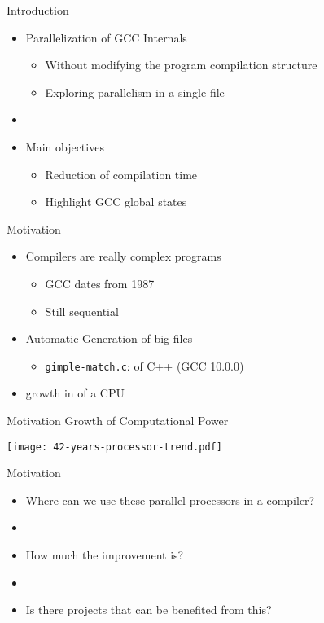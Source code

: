\begin{frame}{Introduction}
    \begin{itemize}
        \item Parallelization of GCC Internals
        \begin{itemize}
            \item Without modifying the program compilation structure
            \item Exploring parallelism in a single file
        \end{itemize}
        \item[]
        \item Main objectives
        \begin{itemize}
            \item Reduction of compilation time
            \item Highlight GCC global states
        \end{itemize}
    \end{itemize}
\end{frame}

\begin{frame}{Motivation}
  \begin{itemize}
    \item Compilers are really complex programs
        \begin{itemize}
            \item GCC dates from 1987
            \item Still sequential
        \end{itemize}
    \item Automatic Generation of big files
        \begin{itemize}
            \item \texttt{gimple-match.c}: {\color{red}{100358 lines}} of C++ (GCC 10.0.0)
        \end{itemize}
    \item {\color{red}{Exponencial}} growth in {\color{blue}{number of cores}} of a CPU
  \end{itemize}
\end{frame}

\begin{frame}{Motivation}
    Growth of Computational Power \citep{42years}

    \centering
    \texttt{[image: 42-years-processor-trend.pdf]}
    \label{fig:42years}
\end{frame}


\begin{frame}{Motivation}
  \begin{itemize}
    \item Where can we use these parallel processors in a compiler?
    \item []
    \item How much the improvement is?
    \item []
    \item Is there projects that can be benefited from this?
  \end{itemize}
\end{frame}


